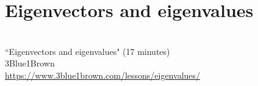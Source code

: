 \section{Eigenvectors and eigenvalues}
\begin{bookfigure}
   \\
  ``Eigenvectors and eigenvalues" (17 minutes) \\
  \footnotesize 3Blue1Brown \\
  \url{https://www.3blue1brown.com/lessons/eigenvalues/}
\end{bookfigure}
